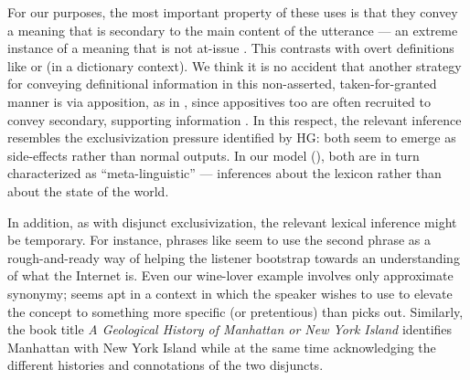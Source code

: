 \documentclass{article}
\begin{document}
For our purposes, the most important property of these uses is that
they convey a meaning that is secondary to the main content of the
utterance --- an extreme instance of a meaning that is not at-issue
\citep{Tonhauser-etal:2011,Dillon-etal:2014}. This contrasts with
overt definitions like  or
 (in a dictionary context).  We think it
is no accident that another strategy for conveying definitional
information in this non-asserted, taken-for-granted manner is via
apposition, as in , since appositives
too are often recruited to convey secondary, supporting information
\citep{Potts05BOOK,Potts08HSK,Syrett-etal:2014}. In this respect, the
relevant inference resembles the exclusivization pressure identified
by HG: both seem to emerge as side-effects rather than normal
outputs. In our model (), both are in turn
characterized as ``meta-linguistic'' --- inferences about the lexicon
rather than about the state of the world.

In addition, as with disjunct exclusivization, the relevant lexical
inference might be temporary. For instance, phrases like
 seem to use the second phrase as a
rough-and-ready way of helping the listener bootstrap towards an
understanding of what the Internet is. Even our wine-lover example
involves only approximate synonymy; 
seems apt in a context in which the speaker wishes to use
 to elevate the concept to something more specific (or
pretentious) than  picks out. Similarly, the book
title \emph{A Geological History of Manhattan or New York Island}
identifies Manhattan with New York Island while at the same time
acknowledging the different histories and connotations of the two
disjuncts.
\end{document}
